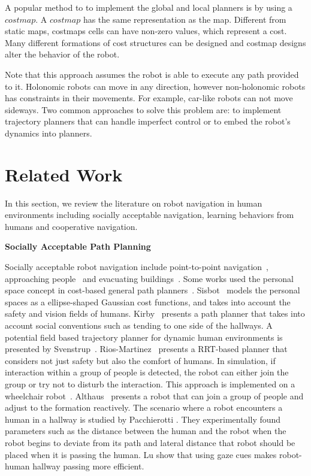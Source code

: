 A popular method to to implement the global and local planners is by using a $costmap$. A $costmap$ has the same representation as the map. Different from static maps, costmaps cells can have non-zero values, which represent a cost. Many different formations of cost structures can be designed and costmap designs alter the behavior of the robot.

Note that this approach assumes the robot is able to execute any path provided to it. Holonomic robots can move in any direction, however non-holonomic robots has constraints in their movements. For example, car-like robots can not move sideways. Two common approaches to solve this problem are: to implement trajectory planners that can handle imperfect control or to embed the robot's dynamics into planners.

\section{Related Work}
\label{sec:navigation_related_work}



In this section, we review the literature on robot navigation in human environments including socially acceptable navigation, learning behaviors from humans and cooperative navigation.

\textbf{Socially Acceptable Path Planning}

Socially acceptable robot navigation include point-to-point navigation~\cite{sisbot2007human}, approaching people~\cite{satake2009approach} and evacuating buildings~\cite{ohki2010collision}. Some works used the personal space concept in cost-based general path planners~\cite{sisbot2007human,kirby2009companion}. Sisbot~\cite{sisbot2007human} models the personal spaces as a ellipse-shaped Gaussian cost functions, and takes into account the safety and vision fields of humans. Kirby~\cite{kirby2009companion} presents a path planner that takes into account social conventions such as tending to one side of the hallways. A potential field based trajectory planner for dynamic human environments is presented by Svenstrup~\cite{svenstrup2010trajectory}. Rios-Martinez~\cite{rios2011understanding} presents a RRT-based planner that considers not just safety but also the comfort of humans. In simulation, if interaction within a group of people is detected, the robot can either join the group or try not to disturb the interaction. This approach is implemented on a wheelchair robot~\cite{vasquez2012human}. Althaus~\cite{althaus2004navigation} presents a robot that can join a group of people and adjust to the formation reactively. The scenario where a robot encounters a human in a hallway is studied by Pacchierotti \cite{pacchierotti2005human}. They experimentally found parameters such as the distance between the human and the robot when the robot begins to deviate from its path and lateral distance that robot should be placed when it is passing the human. Lu \cite{lu2013towards} show that using gaze cues makes robot-human hallway passing more efficient.


